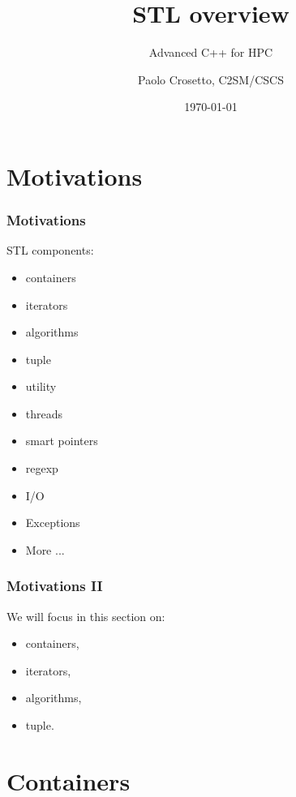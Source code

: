\documentclass[aspectratio=43]{beamer}
\author{Paolo Crosetto, C2SM/CSCS}
\title{STL overview}
\subtitle{Advanced C++ for HPC}
\date{\today}
\begin{document}
\cscstitle



\section{Motivations}

\begin{frame}[fragile]\frametitle{Motivations}
  STL components:
  \begin{itemize}
  \item containers
  \item iterators
  \item algorithms
  \item tuple
  \item utility
  \item threads
  \item smart pointers
  \item regexp
  \item I/O
  \item Exceptions
  \item More ...
  \end{itemize}
\end{frame}

\begin{frame}[fragile]\frametitle{Motivations II}
  We will focus in this section on:
  \begin{itemize}
  \item containers,
  \item iterators,
  \item algorithms,
  \item tuple.
  \end{itemize}
\end{frame}

\section{Containers}
\end{document}
